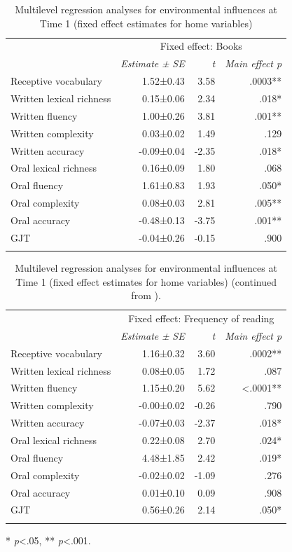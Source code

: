 \documentclass[output=paper,modfonts,nonflat,newtxmath]{langsci/langscibook}
\begin{document}
\begin{table}
\caption{\label{tab:pfenninger:14} Multilevel regression analyses for environmental influences at Time 1 (fixed effect estimates for home variables)}

\begin{tabularx}{.84\textwidth}{l rrr}
\lsptoprule
& \multicolumn{3}{c}{Fixed effect: Books}\\
\cmidrule{2-4}
 & \textit{Estimate} \textit{±} \textit{SE} & \textit{t}  & \textit{Main effect p}\\
\cmidrule{1-4}
Receptive vocabulary & 1.52±0.43 & 3.58 & .0003** \\
Written lexical richness & 0.15±0.06 & 2.34 & .018*  \\
Written fluency & 1.00±0.26 & 3.81 & .001**  \\
Written complexity & 0.03±0.02 & 1.49 & .129  \\
Written accuracy & -0.09±0.04 & -2.35 & .018*  \\
Oral lexical richness & 0.16±0.09 & 1.80 & .068\\
Oral fluency & 1.61±0.83 & 1.93 & .050*  \\
Oral complexity & 0.08±0.03 & 2.81 & .005**  \\
Oral accuracy & -0.48±0.13 & -3.75 & .001**  \\
GJT & -0.04±0.26 & -0.15 & .900 \\
	\lspbottomrule
\end{tabularx}
\end{table}

\begin{table}
	\caption{\label{tab:pfenninger:15} Multilevel regression analyses for environmental influences at Time 1 (fixed effect estimates for home variables) (continued from ).}
	\begin{tabularx}{.84\textwidth}{X rrr}
		\lsptoprule
		& \multicolumn{3}{c}{Fixed effect: Frequency of reading}\\
		\cmidrule{2-4}
		& \textit{Estimate} \textit{±} \textit{SE} & \textit{t}  & \textit{Main effect p}\\
		\cmidrule{1-4}
		Receptive vocabulary & 1.16±0.32 & 3.60 & .0002** \\
		Written lexical richness & 0.08±0.05 & 1.72 & .087 \\
		Written fluency & 1.15±0.20 & 5.62 & <.0001** \\
		Written complexity & -0.00±0.02 & -0.26 & .790 \\
		Written accuracy & -0.07±0.03 & -2.37 & .018* \\
		Oral lexical richness & 0.22±0.08 & 2.70 & .024*\\
		Oral fluency & 4.48±1.85 & 2.42 & .019* \\
		Oral complexity & -0.02±0.02 & -1.09 & .276 \\
		Oral accuracy & 0.01±0.10 & 0.09 & .908 \\
		GJT & 0.56±0.26 & 2.14 & .050* \\
			\lspbottomrule
	\end{tabularx}

	* \textit{p}<.05, ** \textit{p}<.001.
\end{table}
\end{document}
